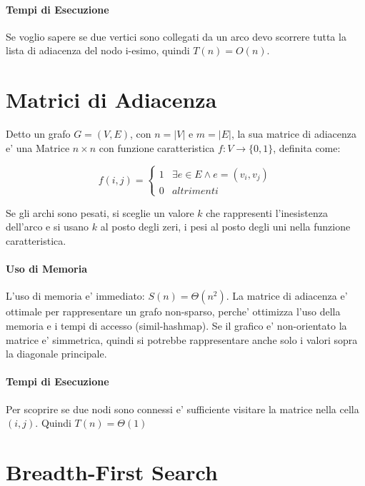 \paragraph{Tempi di Esecuzione}

Se voglio sapere se due vertici sono collegati da un arco devo scorrere tutta la lista di adiacenza del nodo i-esimo, quindi $T(n) = O(n)$.

\section{Matrici di Adiacenza}

Detto un grafo $G = (V, E)$, con $n = |V|$ e $m = |E|$, la sua matrice di adiacenza e' una Matrice $n \times n$ con funzione caratteristica $f : V \rightarrow \{0,1\}$, definita come:

\[
    f(i, j) = 
    \begin{cases}
        1 & \exists e \in E \land e = (v_{i}, v_{j}) \\
        0 & altrimenti
    \end{cases}
\]

Se gli archi sono pesati, si sceglie un valore $k$ che rappresenti l'inesistenza dell'arco e si usano $k$ al posto degli zeri, i pesi al posto degli uni nella funzione caratteristica.

\paragraph{Uso di Memoria}

L'uso di memoria e' immediato: $S(n) = \Theta(n^2)$.
La matrice di adiacenza e' ottimale per rappresentare un grafo non-sparso, perche' ottimizza l'uso della memoria e i tempi di accesso (simil-hashmap).
Se il grafico e' non-orientato la matrice e' simmetrica, quindi si potrebbe rappresentare anche solo i valori sopra la diagonale principale.

\paragraph{Tempi di Esecuzione}

Per scoprire se due nodi sono connessi e' sufficiente visitare la matrice nella cella $(i, j)$. Quindi $T(n) = \Theta(1)$

\section{Breadth-First Search}

